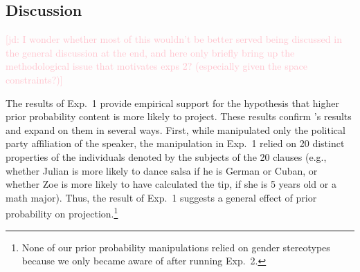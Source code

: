 \documentclass[11pt,fleqn]{article}
\newcommand{\jd}[1]{\textcolor{Pink}{[jd: #1]}}
\newcommand{\jt}[1]{\textbf{\color{blue}JT: #1}}
\newcommand{\6}{\mbox{$[\hspace*{-.6mm}[$}}
\newcommand{\9}{\mbox{$]\hspace*{-.6mm}]$}}
\newcommand{\citepos}[1]{\citeauthor{#1}'s \citeyear{#1}}
\begin{document}
%
%
%

\subsection{Discussion}

\jd{I wonder whether most of this wouldn't be better served being discussed in the general discussion at the end, and here only briefly bring up the methodological issue that motivates exps 2? (especially given the space constraints?)}

The results of Exp.~1 provide empirical support for the hypothesis that higher prior probability content is more likely to project. These results confirm \citepos{mahler2020} results and expand on them in several ways. First, while  manipulated only the political party affiliation of the speaker, the manipulation in Exp.~1 relied on 20 distinct properties of the individuals denoted by the subjects of the 20 clauses (e.g., whether Julian is more likely to dance salsa if he is German or Cuban, or whether Zoe is more likely to have calculated the tip, if she is 5 years old or a math major). Thus, the result of Exp.~1 suggests a general effect of prior probability on projection.\footnote{None of our prior probability manipulations relied on gender stereotypes because we only became aware of  after running Exp.~2.}
\end{document}
